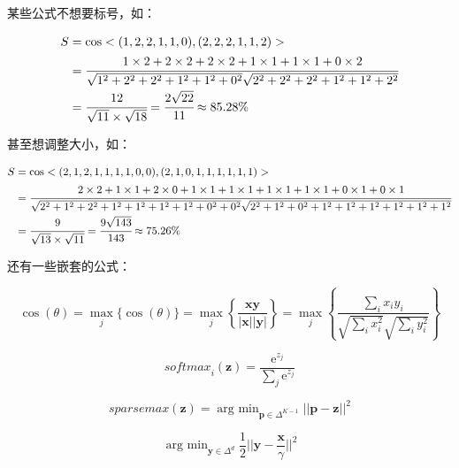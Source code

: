 \documentclass[14pt]{jnuthesis}
\begin{document}
某些公式不想要标号，如：

\begin{equation*}
	\begin{aligned}
		S & = \cos<(1, 2, 2, 1, 1, 0), (2, 2, 2, 1, 1, 2)>  \\
		 & = \cfrac{1 \times 2 + 2 \times 2 + 2 \times 2 + 1 \times 1 + 1 \times 1 + 0 \times 2}{\sqrt{1^2 + 2^2 + 2^2 + 1^2 + 1^2 + 0^2}\sqrt{2^2 + 2^2 + 2^2 + 1^2 + 1^2 + 2^2}}  \\
		 & = \cfrac{12}{\sqrt{11} \times \sqrt{18}} = \cfrac{2\sqrt{22}}{11} \approx 85.28\%
	\end{aligned}
\end{equation*}

甚至想调整大小，如：

\begin{equation*}
	\small
	\begin{aligned}
		S & = \cos<(2, 1, 2, 1, 1, 1, 1, 0, 0), (2, 1, 0, 1, 1, 1, 1, 1, 1)>  \\
		 & = \cfrac{2 \times 2 + 1 \times 1 + 2 \times 0 + 1 \times 1 + 1 \times 1 + 1 \times 1 + 1 \times 1 + 0 \times 1 + 0 \times 1}{\sqrt{2^2 + 1^2 + 2^2 + 1^2 + 1^2 + 1^2 + 1^2 + 0^2 + 0^2}\sqrt{2^2 + 1^2 + 0^2 + 1^2 + 1^2 + 1^2 + 1^2 + 1^2 + 1^2}}  \\
		 & = \cfrac{9}{\sqrt{13} \times \sqrt{11}} = \cfrac{9\sqrt{143}}{143} \approx 75.26\%
	\end{aligned}
\end{equation*}

还有一些嵌套的公式：

\begin{equation*}
	\cos(\theta) = \mathop{\max}_j\{\cos(\theta)\} = \mathop{\max}_j\left\{\frac{\bm{x}\bm{y}}{|\bm{x}||\bm{y}|}\right\} = \mathop{\max}_j\left\{\frac{\mathop{\sum}_i x_i y_i}{\sqrt{\mathop{\sum}_i x_i^2}\sqrt{\mathop{\sum}_i y_i^2}}\right\}
\end{equation*}

\begin{equation*}
	\textit{softmax}_i(\bm{z}) = \frac{\text{e}^{z_j}}{\mathop{\sum}_j\text{e}^{z_j}}
\end{equation*}

\begin{equation*}
	\textit{sparsemax}(\bm{z}) = \mathop{\mathrm{arg} \text{ } \min}_{\bm{p}\in\Delta^{K - 1}}||\bm{p} - \bm{z}||^2
\end{equation*}

\begin{equation*}
	\mathop{\mathrm{arg} \text{ } \min}_{\bm{y}\in\Delta^d}\frac{1}{2}\bigg|\bigg|\bm{y} - \frac{\bm{x}}{\gamma}\bigg|\bigg|^2
\end{equation*}
\end{document}
